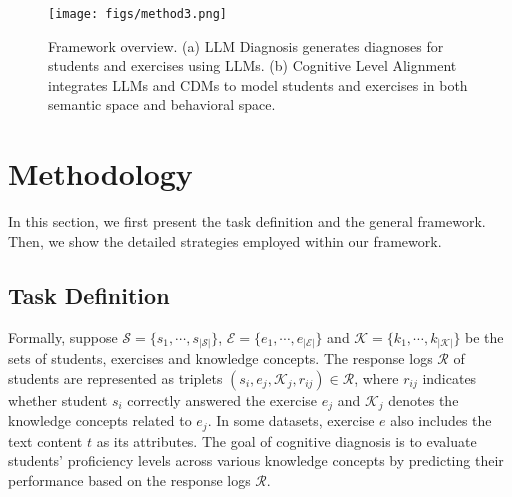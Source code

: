 \begin{figure*}[ht]
  \centering
  
  \texttt{[image: figs/method3.png]}
  \caption{Framework overview. (a) LLM Diagnosis generates diagnoses for students and exercises using LLMs. (b) Cognitive Level Alignment integrates LLMs and CDMs to model students and exercises in both semantic space and behavioral space.}
  \vspace{-1.5em}
\label{fig: method}
\end{figure*}

\section{Methodology}

In this section, we first present the task definition and the general framework. Then, we show the detailed strategies employed within our framework.

\subsection{Task Definition}

Formally, suppose $\mathcal{S} = \{s_1, \cdots, s_{\left|\mathcal{S}\right|}\}$, $\mathcal{E} = \{e_1, \cdots, e_{\left|\mathcal{E}\right|} \}$ and $\mathcal{K} = \{k_1, \cdots, k_{\left|\mathcal{K}\right|} \}$ be the sets of students, exercises and knowledge concepts.
The response logs $\mathcal{R}$ of students are represented as triplets $(s_i, e_j, \mathcal{K}_j, r_{ij}) \in \mathcal{R}$, where $r_{ij}$ indicates whether student $s_i$ correctly answered the exercise $e_j$ and $\mathcal{K}_j$ denotes the knowledge concepts related to $e_j$.
In some datasets, exercise $e$ also includes the text content $t$ as its attributes.
The goal of cognitive diagnosis is to evaluate students' proficiency levels across various knowledge concepts by predicting their performance based on the response logs $\mathcal{R}$.


